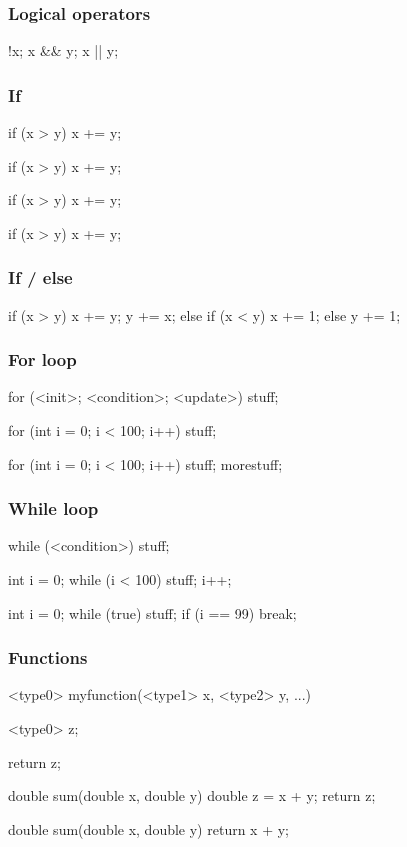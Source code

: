 \begin{frame}[fragile]
  \frametitle{Logical operators}

\begin{c++}
!x;
x && y;
x || y;
\end{c++}

\end{frame}

\begin{frame}[fragile]
  \frametitle{If}

\begin{c++}
if (x > y)
  x += y;

if (x > y) x += y;

if (x > y) { x += y; }

if (x > y)
{
  x += y;
}
\end{c++}

\end{frame}

\begin{frame}[fragile]
  \frametitle{If / else}

\begin{c++}
if (x > y)
{
  x += y;
  y += x;
}
else if (x < y)
{
  x += 1;
}
else
{
  y += 1;
}
\end{c++}

\end{frame}

\begin{frame}[fragile]
  \frametitle{For loop}

\begin{c++}
for (<init>; <condition>; <update>)
  stuff;

for (int i = 0; i < 100; i++)
  stuff;

for (int i = 0; i < 100; i++)
{
  stuff;
  morestuff;
}
\end{c++}

\end{frame}

\begin{frame}[fragile]
  \frametitle{While loop}

\begin{c++}
while (<condition>)
  stuff;

int i = 0;
while (i < 100)
{
  stuff;
  i++;
}

int i = 0;
while (true)
{
  stuff;
  if (i == 99)
    break;
}
\end{c++}

\end{frame}

\begin{frame}[fragile]
  \frametitle{Functions}

\begin{c++}
<type0> myfunction(<type1> x, <type2> y, ...)
{
  <type0> z;

  return z;
}

double sum(double x, double y)
{
  double z = x + y;
  return z;
}

double sum(double x, double y)
{
  return x + y;
}
\end{c++}

\end{frame}

